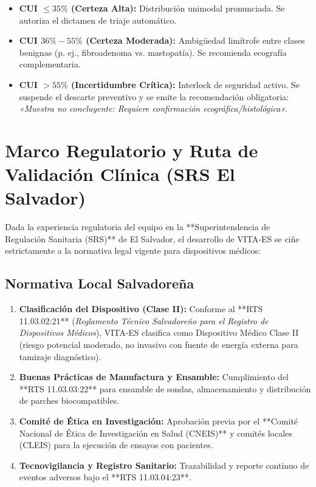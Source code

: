 \documentclass[11pt,a4paper]{article}
\begin{document}
\begin{itemize}
    \item \textbf{CUI $\le 35\%$ (Certeza Alta):} Distribución unimodal pronunciada. Se autoriza el dictamen de triaje automático.
    \item \textbf{CUI $36\% - 55\%$ (Certeza Moderada):} Ambigüedad limítrofe entre clases benignas (p. ej., fibroadenoma vs. mastopatía). Se recomienda ecografía complementaria.
    \item \textbf{CUI $> 55\%$ (Incertidumbre Crítica):} Interlock de seguridad activo. Se suspende el descarte preventivo y se emite la recomendación obligatoria: \textit{«Muestra no concluyente: Requiere confirmación ecográfica/histológica»}.
\end{itemize}

\section{Marco Regulatorio y Ruta de Validación Clínica (SRS El Salvador)}

Dada la experiencia regulatoria del equipo en la **Superintendencia de Regulación Sanitaria (SRS)** de El Salvador, el desarrollo de VITA-ES se ciñe estrictamente a la normativa legal vigente para dispositivos médicos:

\subsection{Normativa Local Salvadoreña}
\begin{enumerate}
    \item \textbf{Clasificación del Dispositivo (Clase II):} Conforme al **RTS 11.03.02:21** (\textit{Reglamento Técnico Salvadoreño para el Registro de Dispositivos Médicos}), VITA-ES clasifica como Dispositivo Médico Clase II (riesgo potencial moderado, no invasivo con fuente de energía externa para tamizaje diagnóstico).
    \item \textbf{Buenas Prácticas de Manufactura y Ensamble:} Cumplimiento del **RTS 11.03.03:22** para ensamble de sondas, almacenamiento y distribución de parches biocompatibles.
    \item \textbf{Comité de Ética en Investigación:} Aprobación previa por el **Comité Nacional de Ética de Investigación en Salud (CNEIS)** y comités locales (CLEIS) para la ejecución de ensayos con pacientes.
    \item \textbf{Tecnovigilancia y Registro Sanitario:} Trazabilidad y reporte continuo de eventos adversos bajo el **RTS 11.03.04:23**.
\end{enumerate}
\end{document}
